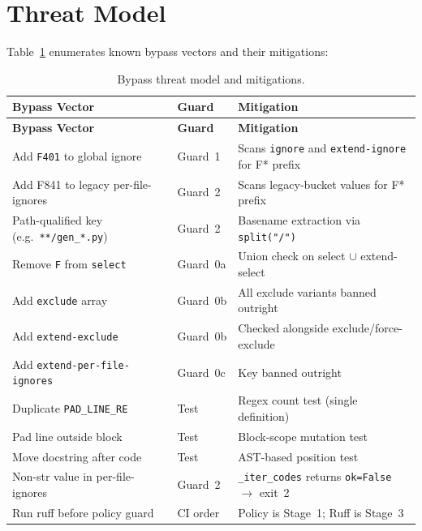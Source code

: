 \documentclass[11pt,a4paper]{article}
\begin{document}
\section{Threat Model}
\label{sec:threats}

Table~\ref{tab:threats} enumerates known bypass vectors and their mitigations:

\begin{longtable}{@{}p{4cm}p{2cm}p{7cm}@{}}
\caption{Bypass threat model and mitigations.}
\label{tab:threats} \\
\toprule
\textbf{Bypass Vector} & \textbf{Guard} & \textbf{Mitigation} \\
\midrule
\endfirsthead
\toprule
\textbf{Bypass Vector} & \textbf{Guard} & \textbf{Mitigation} \\
\midrule
\endhead
Add \texttt{F401} to global ignore &
    Guard~1 & Scans \texttt{ignore} and \texttt{extend-ignore} for F* prefix \\
\addlinespace
Add F841 to legacy per-file-ignores &
    Guard~2 & Scans legacy-bucket values for F* prefix \\
\addlinespace
Path-qualified key (e.g.\ \texttt{**/gen\_*.py}) &
    Guard~2 & Basename extraction via \texttt{split("/")} \\
\addlinespace
Remove \texttt{F} from \texttt{select} &
    Guard~0a & Union check on select $\cup$ extend-select \\
\addlinespace
Add \texttt{exclude} array &
    Guard~0b & All exclude variants banned outright \\
\addlinespace
Add \texttt{extend-exclude} &
    Guard~0b & Checked alongside exclude/force-exclude \\
\addlinespace
Add \texttt{extend-per-file-ignores} &
    Guard~0c & Key banned outright \\
\addlinespace
Duplicate \texttt{PAD\_LINE\_RE} &
    Test & Regex count test (single definition) \\
\addlinespace
Pad line outside block &
    Test & Block-scope mutation test \\
\addlinespace
Move docstring after code &
    Test & AST-based position test \\
\addlinespace
Non-str value in per-file-ignores &
    Guard~2 & \texttt{\_iter\_codes} returns \texttt{ok=False} $\to$ exit~2 \\
\addlinespace
Run ruff before policy guard &
    CI order & Policy is Stage~1; Ruff is Stage~3 \\
\bottomrule
\end{longtable}
\end{document}
